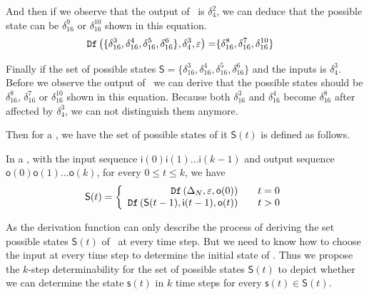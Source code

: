 \begin{example}
And then if we observe that the output of \BCN\ is $\delta_4^2$, we can deduce that the possible state can be $\delta_{16}^{9}$ or  $\delta_{16}^{10}$ shown in this equation. 
\begin{equation*}
\begin{split}
{\tt Df}\left(\{\delta_{16}^3,\delta_{16}^4,\delta_{16}^5,\delta_{16}^6\},\delta_4^3,\varepsilon\right)=&\{\delta_{16}^8,\delta_{16}^{7},\delta_{16}^{10}\}
\end{split}
\label{equ:12}
\end{equation*}

 Finally if the set of possible states $\mathsf{S}=\{\delta_{16}^3, \delta_{16}^4, \delta_{16}^5, \delta_{16}^6\}$ and the inputs is $\delta_4^3$. Before we observe the output of \BCN\ we can derive that the possible states should be $\delta_{16}^8$, $\delta_{16}^7$ or $\delta_{16}^{10}$ shown in this equation. Because both $\delta_{16}^3$ and $\delta_{16}^4$ become $\delta_{16}^8$ after affected by $\delta_4^3$, we can not distinguish them anymore.   %
 \label{exa:8}
 \end{example}   
 
 Then for a \BCN, we have the set of possible states of it $\mathsf{S}(t)$ is defined as follows.
 \begin{definition}[$\mathsf{S}(t)$] In a \BCN, with the input sequence $\mathsf{i}(0)\mathsf{i}(1)\ldots\mathsf{i}(k-1)$ and output sequence $\mathsf{o}(0)\mathsf{o}(1)\ldots\mathsf{o}(k)$, for every $0\le t\le k$, we have
	\[\mathsf{S}(t)=\left\{
\begin{array}{rcl}
{\tt Df}\left(\Delta_N,\varepsilon,\mathsf{o}(0)\right)      &      & {t=0}\\
{\tt Df}\left(\mathsf{S}(t-1),\mathsf{i}(t-1),\mathsf{o}(t)\right)       &      & {t>0}
\end{array} \right. \]

\end{definition}
 
 As the derivation function can only describe the process of deriving the set possible states $\mathsf{S}(t)$ of \BCNs\ at every time step. But we need to know how to choose the input at every time step to determine the initial state of \BCNs. Thus we propose the $k$-step determinability for the set of possible states $\mathsf{S}(t)$ to depict whether we can determine the state $\mathsf{s}(t)$ in $k$ time steps for every $\mathsf{s}(t)\in \mathsf{S}(t)$.
